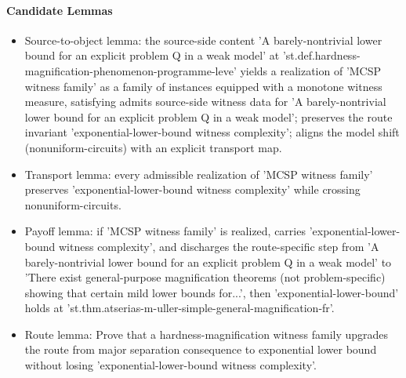 \documentclass[11pt]{article}
\begin{document}
\paragraph{Candidate Lemmas}
\begin{itemize}[leftmargin=*,itemsep=0.2em]
\item Source-to-object lemma: the source-side content 'A barely-nontrivial lower bound for an explicit problem Q in a weak model' at 'st.def.hardness-magnification-phenomenon-programme-leve' yields a realization of 'MCSP witness family' as a family of instances equipped with a monotone witness measure, satisfying admits source-side witness data for 'A barely-nontrivial lower bound for an explicit problem Q in a weak model'; preserves the route invariant 'exponential-lower-bound witness complexity'; aligns the model shift (nonuniform-circuits) with an explicit transport map.
\item Transport lemma: every admissible realization of 'MCSP witness family' preserves 'exponential-lower-bound witness complexity' while crossing nonuniform-circuits.
\item Payoff lemma: if 'MCSP witness family' is realized, carries 'exponential-lower-bound witness complexity', and discharges the route-specific step from 'A barely-nontrivial lower bound for an explicit problem Q in a weak model' to 'There exist general-purpose magnification theorems (not problem-specific) showing that certain mild lower bounds for...', then 'exponential-lower-bound' holds at 'st.thm.atserias-m-uller-simple-general-magnification-fr'.
\item Route lemma: Prove that a hardness-magnification witness family upgrades the route from major separation consequence to exponential lower bound without losing 'exponential-lower-bound witness complexity'.
\end{itemize}
\end{document}
